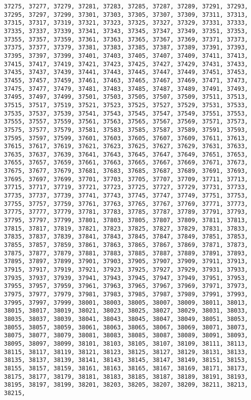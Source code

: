 \documentclass[11pt]{article}
\begin{document}
\begin{Verbatim}[commandchars=\\\{\}]
37275, 37277, 37279, 37281, 37283, 37285, 37287, 37289, 37291, 37293, 37295, 37297, 37299, 37301, 37303, 37305, 37307, 37309, 37311, 37313, 37315, 37317, 37319, 37321, 37323, 37325, 37327, 37329, 37331, 37333, 37335, 37337, 37339, 37341, 37343, 37345, 37347, 37349, 37351, 37353, 37355, 37357, 37359, 37361, 37363, 37365, 37367, 37369, 37371, 37373, 37375, 37377, 37379, 37381, 37383, 37385, 37387, 37389, 37391, 37393, 37395, 37397, 37399, 37401, 37403, 37405, 37407, 37409, 37411, 37413, 37415, 37417, 37419, 37421, 37423, 37425, 37427, 37429, 37431, 37433, 37435, 37437, 37439, 37441, 37443, 37445, 37447, 37449, 37451, 37453, 37455, 37457, 37459, 37461, 37463, 37465, 37467, 37469, 37471, 37473, 37475, 37477, 37479, 37481, 37483, 37485, 37487, 37489, 37491, 37493, 37495, 37497, 37499, 37501, 37503, 37505, 37507, 37509, 37511, 37513, 37515, 37517, 37519, 37521, 37523, 37525, 37527, 37529, 37531, 37533, 37535, 37537, 37539, 37541, 37543, 37545, 37547, 37549, 37551, 37553, 37555, 37557, 37559, 37561, 37563, 37565, 37567, 37569, 37571, 37573, 37575, 37577, 37579, 37581, 37583, 37585, 37587, 37589, 37591, 37593, 37595, 37597, 37599, 37601, 37603, 37605, 37607, 37609, 37611, 37613, 37615, 37617, 37619, 37621, 37623, 37625, 37627, 37629, 37631, 37633, 37635, 37637, 37639, 37641, 37643, 37645, 37647, 37649, 37651, 37653, 37655, 37657, 37659, 37661, 37663, 37665, 37667, 37669, 37671, 37673, 37675, 37677, 37679, 37681, 37683, 37685, 37687, 37689, 37691, 37693, 37695, 37697, 37699, 37701, 37703, 37705, 37707, 37709, 37711, 37713, 37715, 37717, 37719, 37721, 37723, 37725, 37727, 37729, 37731, 37733, 37735, 37737, 37739, 37741, 37743, 37745, 37747, 37749, 37751, 37753, 37755, 37757, 37759, 37761, 37763, 37765, 37767, 37769, 37771, 37773, 37775, 37777, 37779, 37781, 37783, 37785, 37787, 37789, 37791, 37793, 37795, 37797, 37799, 37801, 37803, 37805, 37807, 37809, 37811, 37813, 37815, 37817, 37819, 37821, 37823, 37825, 37827, 37829, 37831, 37833, 37835, 37837, 37839, 37841, 37843, 37845, 37847, 37849, 37851, 37853, 37855, 37857, 37859, 37861, 37863, 37865, 37867, 37869, 37871, 37873, 37875, 37877, 37879, 37881, 37883, 37885, 37887, 37889, 37891, 37893, 37895, 37897, 37899, 37901, 37903, 37905, 37907, 37909, 37911, 37913, 37915, 37917, 37919, 37921, 37923, 37925, 37927, 37929, 37931, 37933, 37935, 37937, 37939, 37941, 37943, 37945, 37947, 37949, 37951, 37953, 37955, 37957, 37959, 37961, 37963, 37965, 37967, 37969, 37971, 37973, 37975, 37977, 37979, 37981, 37983, 37985, 37987, 37989, 37991, 37993, 37995, 37997, 37999, 38001, 38003, 38005, 38007, 38009, 38011, 38013, 38015, 38017, 38019, 38021, 38023, 38025, 38027, 38029, 38031, 38033, 38035, 38037, 38039, 38041, 38043, 38045, 38047, 38049, 38051, 38053, 38055, 38057, 38059, 38061, 38063, 38065, 38067, 38069, 38071, 38073, 38075, 38077, 38079, 38081, 38083, 38085, 38087, 38089, 38091, 38093, 38095, 38097, 38099, 38101, 38103, 38105, 38107, 38109, 38111, 38113, 38115, 38117, 38119, 38121, 38123, 38125, 38127, 38129, 38131, 38133, 38135, 38137, 38139, 38141, 38143, 38145, 38147, 38149, 38151, 38153, 38155, 38157, 38159, 38161, 38163, 38165, 38167, 38169, 38171, 38173, 38175, 38177, 38179, 38181, 38183, 38185, 38187, 38189, 38191, 38193, 38195, 38197, 38199, 38201, 38203, 38205, 38207, 38209, 38211, 38213, 38215, 
\end{Verbatim}
\end{document}
